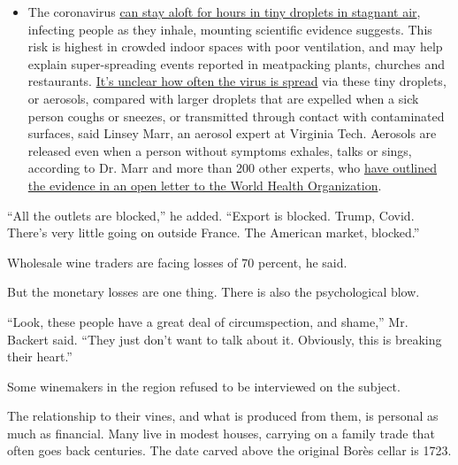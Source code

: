 \begin{itemize}
  \begin{itemize}
  \tightlist
  \item
    The coronavirus
    \href{https://www.nytimes.com/2020/07/04/health/239-experts-with-one-big-claim-the-coronavirus-is-airborne.html?action=click\&pgtype=Article\&state=default\&region=MAIN_CONTENT_3\&context=storylines_faq}{can
    stay aloft for hours in tiny droplets in stagnant air}, infecting
    people as they inhale, mounting scientific evidence suggests. This
    risk is highest in crowded indoor spaces with poor ventilation, and
    may help explain super-spreading events reported in meatpacking
    plants, churches and restaurants.
    \href{https://www.nytimes.com/2020/07/06/health/coronavirus-airborne-aerosols.html?action=click\&pgtype=Article\&state=default\&region=MAIN_CONTENT_3\&context=storylines_faq}{It's
    unclear how often the virus is spread} via these tiny droplets, or
    aerosols, compared with larger droplets that are expelled when a
    sick person coughs or sneezes, or transmitted through contact with
    contaminated surfaces, said Linsey Marr, an aerosol expert at
    Virginia Tech. Aerosols are released even when a person without
    symptoms exhales, talks or sings, according to Dr. Marr and more
    than 200 other experts, who
    \href{https://academic.oup.com/cid/article/doi/10.1093/cid/ciaa939/5867798}{have
    outlined the evidence in an open letter to the World Health
    Organization}.
  \end{itemize}
\end{itemize}

``All the outlets are blocked,'' he added. ``Export is blocked. Trump,
Covid. There's very little going on outside France. The American market,
blocked.''

Wholesale wine traders are facing losses of 70 percent, he said.

But the monetary losses are one thing. There is also the psychological
blow.

``Look, these people have a great deal of circumspection, and shame,''
Mr. Backert said. ``They just don't want to talk about it. Obviously,
this is breaking their heart.''

Some winemakers in the region refused to be interviewed on the subject.

The relationship to their vines, and what is produced from them, is
personal as much as financial. Many live in modest houses, carrying on a
family trade that often goes back centuries. The date carved above the
original Borès cellar is 1723.

